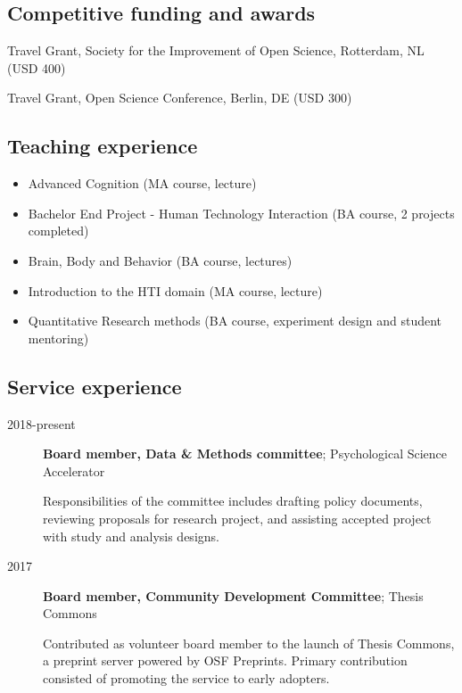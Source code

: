 \documentclass[]{article}
\providecommand{\tightlist}{%
  \setlength{\itemsep}{0pt}\setlength{\parskip}{0pt}}
\begin{document}
\hypertarget{competitive-funding-and-awards}{%
\subsection{Competitive funding and
awards}\label{competitive-funding-and-awards}}

Travel Grant, Society for the Improvement of Open Science, Rotterdam, NL
(USD 400)

Travel Grant, Open Science Conference, Berlin, DE (USD 300)

\hypertarget{teaching-experience}{%
\subsection{Teaching experience}\label{teaching-experience}}

\begin{itemize}
\tightlist
\item
  Advanced Cognition (MA course, lecture)
\item
  Bachelor End Project - Human Technology Interaction (BA course, 2
  projects completed)
\item
  Brain, Body and Behavior (BA course, lectures)
\item
  Introduction to the HTI domain (MA course, lecture)
\item
  Quantitative Research methods (BA course, experiment design and
  student mentoring)
\end{itemize}

\hypertarget{service-experience}{%
\subsection{Service experience}\label{service-experience}}

\begin{description}
\item[2018-present]
\textbf{Board member, Data \& Methods committee}; Psychological Science
Accelerator

Responsibilities of the committee includes drafting policy documents,
reviewing proposals for research project, and assisting accepted project
with study and analysis designs.
\item[2017]
\textbf{Board member, Community Development Committee}; Thesis Commons

Contributed as volunteer board member to the launch of Thesis Commons, a
preprint server powered by OSF Preprints. Primary contribution consisted
of promoting the service to early adopters.
\end{description}
\end{document}
